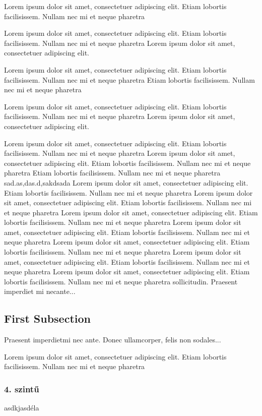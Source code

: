 \documentclass[12pt,oneside,justify]{book}
\begin{document}
Lorem ipsum dolor sit amet, consectetuer adipiscing elit.  
Etiam lobortis facilisissem.  Nullam nec mi et neque pharetra  
 
Lorem ipsum dolor sit amet, consectetuer adipiscing elit.  
Etiam lobortis facilisissem.  Nullam nec mi et neque pharetra Lorem ipsum dolor sit amet, consectetuer adipiscing elit.  
 
Lorem ipsum dolor sit amet, consectetuer adipiscing elit.  
Etiam lobortis facilisissem.  Nullam nec mi et neque pharetra Etiam lobortis facilisissem.  Nullam nec mi et neque pharetra  
 
Lorem ipsum dolor sit amet, consectetuer adipiscing elit.  
Etiam lobortis facilisissem.  Nullam nec mi et neque pharetra Lorem ipsum dolor sit amet, consectetuer adipiscing elit.  
 
Lorem ipsum dolor sit amet, consectetuer adipiscing elit.  
Etiam lobortis facilisissem.  Nullam nec mi et neque pharetra  
Lorem ipsum dolor sit amet, consectetuer adipiscing elit.  
Etiam lobortis facilisissem.  Nullam nec mi et neque pharetra Etiam lobortis facilisissem.  Nullam nec mi et neque pharetra 
 sad.as,das.d,sakdsada
Lorem ipsum dolor sit amet, consectetuer adipiscing elit.  
Etiam lobortis facilisissem.  Nullam nec mi et neque pharetra  
Lorem ipsum dolor sit amet, consectetuer adipiscing elit.  
Etiam lobortis facilisissem.  Nullam nec mi et neque pharetra  
Lorem ipsum dolor sit amet, consectetuer adipiscing elit.  
Etiam lobortis facilisissem.  Nullam nec mi et neque pharetra  
Lorem ipsum dolor sit amet, consectetuer adipiscing elit.  
Etiam lobortis facilisissem.  Nullam nec mi et neque pharetra  
Lorem ipsum dolor sit amet, consectetuer adipiscing elit.  
Etiam lobortis facilisissem.  Nullam nec mi et neque pharetra  
Lorem ipsum dolor sit amet, consectetuer adipiscing elit.  
Etiam lobortis facilisissem.  Nullam nec mi et neque pharetra  
Lorem ipsum dolor sit amet, consectetuer adipiscing elit.  
Etiam lobortis facilisissem.  Nullam nec mi et neque pharetra sollicitudin.  Praesent imperdiet mi necante...
 
\subsection{First Subsection}
Praesent imperdietmi nec ante. Donec ullamcorper, felis non sodales...
 
Lorem ipsum dolor sit amet, consectetuer adipiscing elit.  
Etiam lobortis facilisissem.  Nullam nec mi et neque pharetra 
\subsubsection{4. szintű}
asdkjasdéla
 
\end{document}
